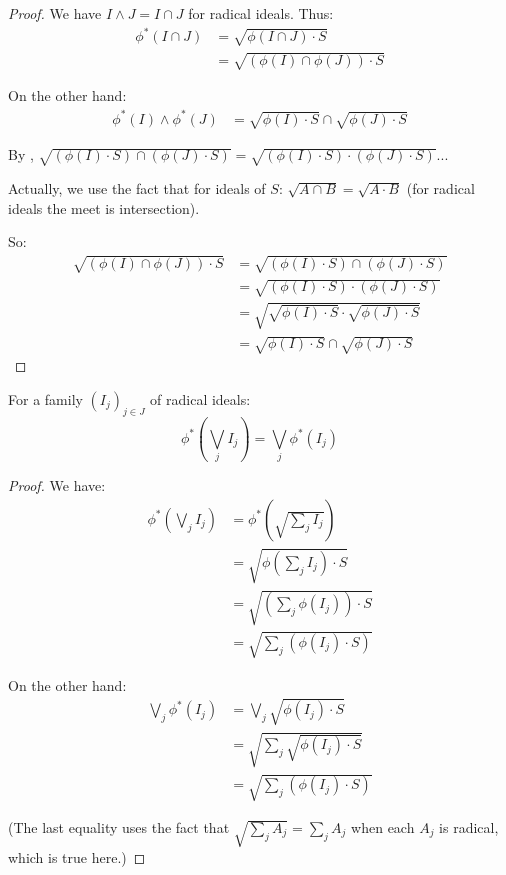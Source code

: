 \begin{proof}
  \leanok
  We have $I \land J = I \cap J$ for radical ideals. Thus:
  \begin{align*}
    \phi^*(I \cap J) &= \sqrt{\phi(I \cap J) \cdot S} \\
    &= \sqrt{(\phi(I) \cap \phi(J)) \cdot S}
  \end{align*}
  
  On the other hand:
  \begin{align*}
    \phi^*(I) \land \phi^*(J) &= \sqrt{\phi(I) \cdot S} \cap \sqrt{\phi(J) \cdot S}
  \end{align*}
  
  By , $\sqrt{(\phi(I) \cdot S) \cap (\phi(J) \cdot S)} = \sqrt{(\phi(I) \cdot S) \cdot (\phi(J) \cdot S)}$... 
  
  Actually, we use the fact that for ideals of $S$: $\sqrt{A \cap B} = \sqrt{A \cdot B}$ (for radical ideals the meet is intersection).
  
  So:
  \begin{align*}
    \sqrt{(\phi(I) \cap \phi(J)) \cdot S} &= \sqrt{(\phi(I) \cdot S) \cap (\phi(J) \cdot S)} \\
    &= \sqrt{(\phi(I) \cdot S) \cdot (\phi(J) \cdot S)} \\
    &= \sqrt{\sqrt{\phi(I) \cdot S} \cdot \sqrt{\phi(J) \cdot S}} \\
    &= \sqrt{\phi(I) \cdot S} \cap \sqrt{\phi(J) \cdot S}
  \end{align*}
\end{proof}

\begin{lemma}
  \label{lemma:preserve-arbitrary-joins}
  \leanok
  For a family $(I_j)_{j \in J}$ of radical ideals:
  $$\phi^*(\bigvee_j I_j) = \bigvee_j \phi^*(I_j)$$
\end{lemma}

\begin{proof}
  \leanok
  We have:
  \begin{align*}
    \phi^*(\bigvee_j I_j) &= \phi^*(\sqrt{\sum_j I_j}) \\
    &= \sqrt{\phi(\sum_j I_j) \cdot S} \\
    &= \sqrt{(\sum_j \phi(I_j)) \cdot S} \\
    &= \sqrt{\sum_j (\phi(I_j) \cdot S)}
  \end{align*}

  On the other hand:
  \begin{align*}
    \bigvee_j \phi^*(I_j) &= \bigvee_j \sqrt{\phi(I_j) \cdot S} \\
    &= \sqrt{\sum_j \sqrt{\phi(I_j) \cdot S}} \\
    &= \sqrt{\sum_j (\phi(I_j) \cdot S)}
  \end{align*}
  
  (The last equality uses the fact that $\sqrt{\sum_j A_j} = \sum_j A_j$ when each $A_j$ is radical, which is true here.)
\end{proof}

